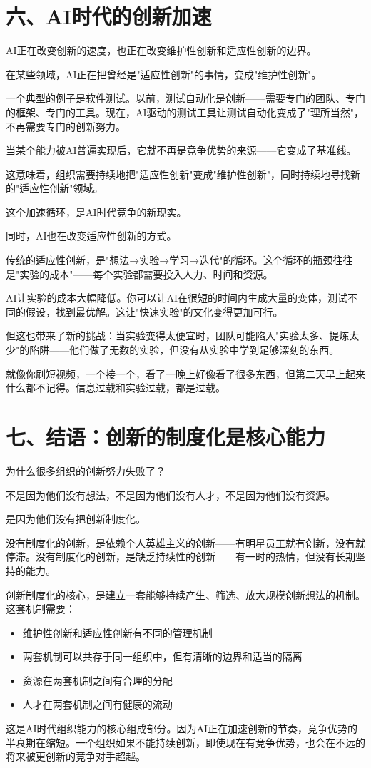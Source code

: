 \section{六、AI时代的创新加速}


AI正在改变创新的速度，也正在改变维护性创新和适应性创新的边界。

在某些领域，AI正在把曾经是"适应性创新"的事情，变成"维护性创新"。

一个典型的例子是软件测试。以前，测试自动化是创新——需要专门的团队、专门的框架、专门的工具。现在，AI驱动的测试工具让测试自动化变成了"理所当然"，不再需要专门的创新努力。

当某个能力被AI普遍实现后，它就不再是竞争优势的来源——它变成了基准线。

这意味着，组织需要持续地把"适应性创新"变成"维护性创新"，同时持续地寻找新的"适应性创新"领域。

这个加速循环，是AI时代竞争的新现实。

同时，AI也在改变适应性创新的方式。

传统的适应性创新，是"想法→实验→学习→迭代"的循环。这个循环的瓶颈往往是"实验的成本"——每个实验都需要投入人力、时间和资源。

AI让实验的成本大幅降低。你可以让AI在很短的时间内生成大量的变体，测试不同的假设，找到最优解。这让"快速实验"的文化变得更加可行。

但这也带来了新的挑战：当实验变得太便宜时，团队可能陷入"实验太多、提炼太少"的陷阱——他们做了无数的实验，但没有从实验中学到足够深刻的东西。

就像你刷短视频，一个接一个，看了一晚上好像看了很多东西，但第二天早上起来什么都不记得。信息过载和实验过载，都是过载。

\section{七、结语：创新的制度化是核心能力}


为什么很多组织的创新努力失败了？

不是因为他们没有想法，不是因为他们没有人才，不是因为他们没有资源。

是因为他们没有把创新制度化。

没有制度化的创新，是依赖个人英雄主义的创新——有明星员工就有创新，没有就停滞。没有制度化的创新，是缺乏持续性的创新——有一时的热情，但没有长期坚持的能力。

创新制度化的核心，是建立一套能够持续产生、筛选、放大规模创新想法的机制。这套机制需要：
\begin{itemize}
\item 维护性创新和适应性创新有不同的管理机制
\item 两套机制可以共存于同一组织中，但有清晰的边界和适当的隔离
\item 资源在两套机制之间有合理的分配
\item 人才在两套机制之间有健康的流动

\end{itemize}
这是AI时代组织能力的核心组成部分。因为AI正在加速创新的节奏，竞争优势的半衰期在缩短。一个组织如果不能持续创新，即使现在有竞争优势，也会在不远的将来被更创新的竞争对手超越。

